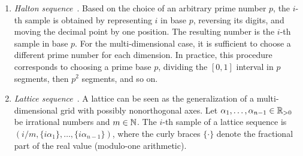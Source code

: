 \begin{enumerate}
	\item \emph{Halton sequence}~\cite{morokoff1994quasi}.
Based on the choice of an arbitrary prime number $p$,
the $i$-th sample is obtained by representing $i$ in base $p$, reversing its digits, and 
moving the decimal point by one position. The resulting number is the $i$-th sample 
in base $p$. For the multi-dimensional case, it is sufficient to choose a different prime number for each dimension.
In practice, this procedure corresponds to choosing a prime base $p$, dividing the $[0,1]$ interval in $p$ segments,
then $p^2$ segments, and so on.
	\item \emph{Lattice sequence}~\cite{matousek2009geometric}. A lattice can be seen as the generalization of a multi-dimensional grid
with possibly nonorthogonal axes. Let $\alpha_1, \dots, \alpha_{n-1} \in \mathbb{R}_{> 0}$ be irrational numbers
and $m \in \mathbb{N}$. The $i$-th sample of a lattice sequence is $(i/m,\{i\alpha_1\}, \dots,\{i\alpha_{n-1}\})$, where the curly braces  
$\{ \cdot \}$ denote the fractional part of the real value (modulo-one arithmetic). 
\end{enumerate}

